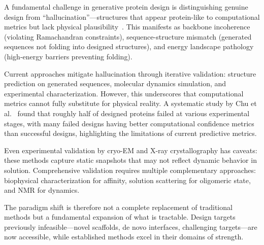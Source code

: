 A fundamental challenge in generative protein design is distinguishing genuine design from ``hallucination''---structures that appear protein-like to computational metrics but lack physical plausibility~\cite{anishchenko2021hallucination}. This manifests as backbone incoherence (violating Ramachandran constraints), sequence-structure mismatch (generated sequences not folding into designed structures), and energy landscape pathology (high-energy barriers preventing folding).

Current approaches mitigate hallucination through iterative validation: structure prediction on generated sequences, molecular dynamics simulation, and experimental characterization. However, this underscores that computational metrics cannot fully substitute for physical reality. A systematic study by Chu et al.~\cite{chu2025prediction} found that roughly half of designed proteins failed at various experimental stages, with many failed designs having better computational confidence metrics than successful designs, highlighting the limitations of current predictive metrics.

Even experimental validation by cryo-EM and X-ray crystallography has caveats: these methods capture static snapshots that may not reflect dynamic behavior in solution. Comprehensive validation requires multiple complementary approaches: biophysical characterization for affinity, solution scattering for oligomeric state, and NMR for dynamics.

The paradigm shift is therefore not a complete replacement of traditional methods but a fundamental expansion of what is tractable. Design targets previously infeasible---novel scaffolds, de novo interfaces, challenging targets---are now accessible, while established methods excel in their domains of strength.
